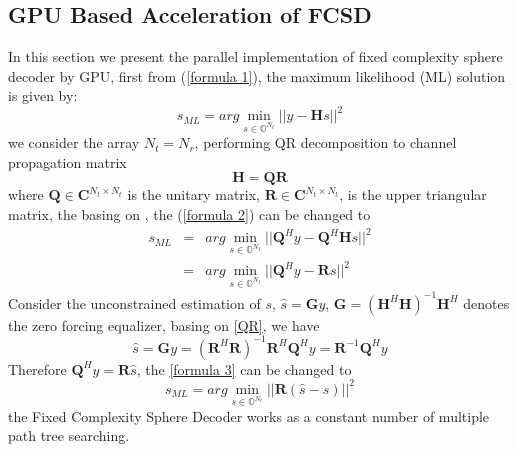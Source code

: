 \documentclass[12pt,a4paper,final]{article}
\begin{document}
\begin{spacing}{2.5}
\section{GPU Based Acceleration of FCSD}\label{GPUFCSD}
In this section we present the parallel implementation of fixed complexity sphere decoder by GPU, first from (\ref{formula 1}), the maximum likelihood (ML) solution is given by:
\begin{equation}
s_{ML}=arg\min_{s\in \mathbb{O}^{N_{t}}}||y-\mathbf{H}s||^{2} \label{formula 2}
\end{equation}
we consider the array $N_{t}=N_{r}$, performing QR decomposition to channel propagation matrix
\begin{equation}
 \mathbf{H}=\mathbf{Q}\mathbf{R}  \label{QR}
\end{equation}
where $\mathbf{Q}\in \mathbf{C}^{N_{t}\times N_{t}}$ is the unitary matrix, $\mathbf{R}\in \mathbf{C}^{N_{t}\times N_{t}}$, is the upper triangular matrix, the basing on \cite{matrix theory}, the (\ref{formula 2}) can be changed to
\begin{eqnarray}
\nonumber
s_{ML}&=&arg\min_{s\in \mathbb{O}^{N_{t}}}||\mathbf{Q}^{H}y-\mathbf{Q}^{H}\mathbf{H}s||^{2}\\
&=& arg\min_{s\in \mathbb{O}^{N_{t}}}||\mathbf{Q}^{H}y-\mathbf{R}s||^{2} \label{formula 3}
\end{eqnarray}
Consider the unconstrained estimation of $s$, $\hat{s}=\mathbf{G}y$, $\mathbf{G}=(\mathbf{H}^{H}\mathbf{H})^{-1}\mathbf{H}^{H}$ denotes the zero forcing equalizer, basing on \ref{QR}, we have  
\begin{equation}
\hat{s}=\mathbf{G}y=(\mathbf{R}^{H}\mathbf{R})^{-1}\mathbf{R}^{H}\mathbf{Q}^{H}y=\mathbf{R}^{-1}\mathbf{Q}^{H}y 
\label{unconstrained estimation}
\end{equation} 
Therefore $\mathbf{Q}^{H}y=\mathbf{R}\hat{s}$, the \ref{formula 3} can be changed to
\begin{equation}
s_{ML}=arg\min_{s\in \mathbb{O}^{N_{t}}}||\mathbf{R}(\hat{s}-s)||^{2} \label{formula 4}
\end{equation}
the Fixed Complexity Sphere Decoder works as a constant number of multiple path tree searching.
\begin{figure}[tb]
\centering

\end{figure}
\end{spacing}
\end{document}
